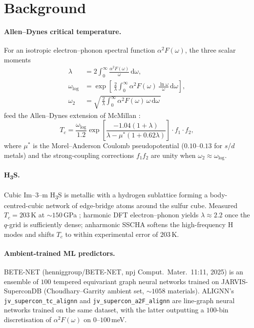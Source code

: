 \documentclass[11pt,a4paper]{article}
\begin{document}
\section{Background}
\label{sec:bg}

\paragraph{Allen--Dynes critical temperature.}
For an isotropic electron--phonon spectral function $\alpha^2 F(\omega)$, the three
scalar moments
\begin{align}
\lambda      &= 2\int_0^\infty \frac{\alpha^2 F(\omega)}{\omega}\,\mathrm{d}\omega,
\label{eq:lambda}\\
\omega_{\log} &= \exp\!\left[\,\frac{2}{\lambda}\int_0^\infty
\alpha^2 F(\omega)\,\frac{\ln\omega}{\omega}\,\mathrm{d}\omega\right],
\label{eq:wlog}\\
\omega_2      &= \sqrt{\,\frac{2}{\lambda}\int_0^\infty
\alpha^2 F(\omega)\,\omega\,\mathrm{d}\omega\,}
\label{eq:w2}
\end{align}
feed the Allen--Dynes \cite{allendynes1975} extension of McMillan \cite{mcmillan1968}:
\begin{equation}
T_c = \frac{\omega_{\log}}{1.2}
\exp\!\left[\frac{-1.04(1+\lambda)}{\lambda - \mu^*(1+0.62\lambda)}\right] \cdot f_1 \cdot f_2,
\label{eq:ad}
\end{equation}
where $\mu^*$ is the Morel--Anderson \cite{morelanderson1962} Coulomb pseudopotential
($0.10$--$0.13$ for $s$/$d$ metals) and the strong-coupling corrections $f_1 f_2$ are
unity when $\omega_2 \approx \omega_{\log}$.

\paragraph{H\textsubscript{3}S.}
Cubic Im--3--m H\textsubscript{3}S is metallic with a hydrogen sublattice forming a
body-centred-cubic network of edge-bridge atoms around the sulfur cube. Measured
$T_c = 203$\,K at $\sim 150$\,GPa \cite{drozdov2015h3s}; harmonic DFT
electron--phonon \cite{errea2016h3s} yields $\lambda \approx 2.2$ once the
$q$-grid is sufficiently dense; anharmonic SSCHA softens the high-frequency H
modes and shifts $T_c$ to within experimental error of $203$\,K.

\paragraph{Ambient-trained ML predictors.}
BETE-NET \cite{gibson2025betenet} (henniggroup/BETE-NET, npj Comput.\ Mater.\
11:11, 2025) is an ensemble of $100$ tempered equivariant graph neural networks
trained on JARVIS-SuperconDB \cite{jarvis_supercon_db} (Choudhary--Garrity
\cite{choudhary2022alignn} ambient set, $\sim 1058$ materials). ALIGNN's
\texttt{jv\_supercon\_tc\_alignn} and \texttt{jv\_supercon\_a2F\_alignn}
\cite{choudhary2022alignn} are line-graph neural networks trained on the same
dataset, with the latter outputting a $100$-bin discretisation of $\alpha^2 F(\omega)$
on $0$--$100$\,meV.
\end{document}
